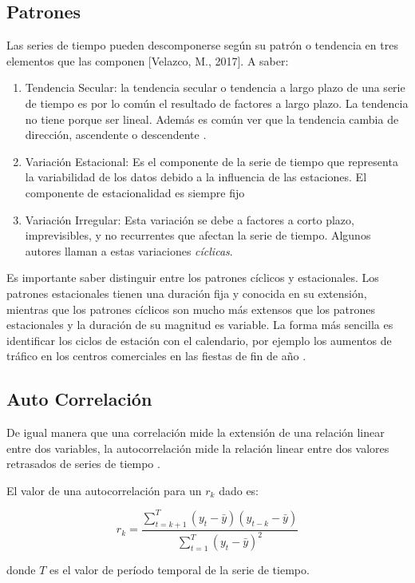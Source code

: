 \begin{spacing}{1.5}
\subsection{Patrones}
Las series de tiempo pueden descomponerse según su patrón o tendencia en tres elementos que las componen [Velazco, M., 2017]. A saber:

\begin{enumerate}
	\item Tendencia Secular: la tendencia secular o tendencia a largo plazo de una serie de tiempo es por lo común el resultado de factores a largo plazo. La tendencia no tiene porque ser lineal. Además es común ver que la tendencia cambia de dirección, ascendente o descendente \cite{hyndman}.
	\item Variación Estacional: Es el componente de la serie de tiempo que representa la variabilidad de los datos debido a la influencia de las estaciones. El componente de estacionalidad es siempre fijo \cite{hyndman}
	\item Variación Irregular: Esta variación se debe a factores a corto plazo, imprevisibles, y no recurrentes que afectan la serie de tiempo. Algunos autores llaman a estas variaciones \emph{cíclicas}. 
\end{enumerate}

Es importante saber distinguir entre los patrones cíclicos y estacionales. Los patrones estacionales tienen una duración fija y conocida en su extensión, mientras que los patrones cíclicos son mucho más extensos que los patrones estacionales y la duración de su magnitud es variable. La forma más sencilla es identificar los ciclos de estación con el calendario, por ejemplo los aumentos de tráfico en los centros comerciales en las fiestas de fin de año \cite{hyndman}. 

\subsection{Auto Correlación}
De igual manera que una correlación mide la extensión de una relación linear entre dos variables, la autocorrelación mide la relación linear entre dos valores retrasados de series de tiempo \cite{hyndman}.

El valor de una autocorrelación para un \(r_{k}\) dado es:

\[ r_{k} = \frac{\sum_{t = k + 1}^T(y_{t} - \bar{y})(y_{t - k} - \bar{y})}{\sum_{t = 1}^T(y_{t} - \bar{y})^{2}} \]

donde \(T\) es el valor de período temporal de la serie de tiempo. 


\end{spacing}
